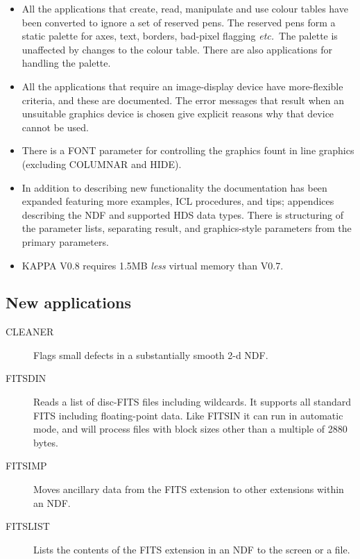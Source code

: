 {\begin{itemize}
  \item All the applications that create, read, manipulate and use colour
    tables have been converted to ignore a set of reserved pens.  The
    reserved pens form a static palette for axes, text, borders,
    bad-pixel flagging {\it etc.}\  The palette is unaffected by changes to
    the colour table.  There are also applications for handling the
    palette.

  \item All the applications that require an image-display device have
    more-flexible criteria, and these are documented.  The error
    messages that result when an unsuitable graphics device is chosen
    give explicit reasons why that device cannot be used.

  \item There is a FONT parameter for controlling the graphics fount in
    line graphics (excluding COLUMNAR and HIDE).

  \item  In addition to describing new functionality the documentation
    has been expanded featuring more examples, {\small ICL} procedures,
    and tips; appendices describing the NDF and supported HDS data types. 
    There is structuring of the parameter lists, separating result, and
    graphics-style parameters from the primary parameters. 

  \item {\small KAPPA} V0.8 requires 1.5MB {\em less\/} virtual memory than V0.7.
\end{itemize}

\subsection{New applications}
\begin{description}
  \item [CLEANER]  Flags small defects in a substantially smooth 2-d NDF.

  \item [FITSDIN]  Reads a list of disc-FITS files including wildcards.
    It supports all standard FITS including floating-point data.
    Like FITSIN it can run in automatic mode, and will process files
    with block sizes other than a multiple of 2880 bytes.

  \item [FITSIMP]  Moves ancillary data from the FITS extension to other
    extensions within an NDF.

  \item [FITSLIST]  Lists the contents of the FITS extension in an NDF to
    the screen or a file.


\end{description}}
